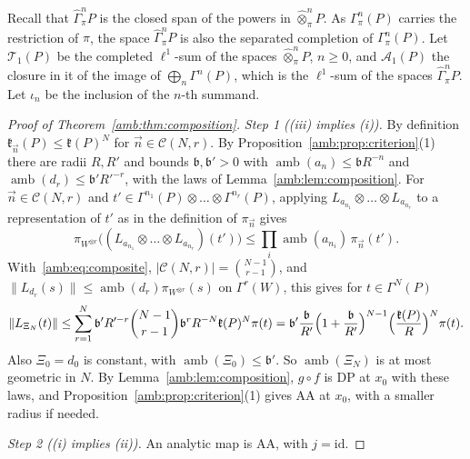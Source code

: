 \documentclass[11pt]{amsart}
\theoremstyle{definition}
\theoremstyle{remark}
\numberwithin{equation}{section}
\newcommand{\id}{\mathrm{id}}
\newcommand{\abs}[1]{\lvert #1\rvert}
\newcommand{\norm}[1]{\lVert #1\rVert}
\theoremstyle{plain}
\theoremstyle{definition}
\theoremstyle{plain}
\newcommand{\hGamma}{\widehat\Gamma}
\begin{document}
Recall that $\hGamma^n_\pi P$ is the closed span of the powers in $\widehat\otimes^n_\pi P$. As $\Gamma^n_\pi(P)$ carries the restriction of $\pi$, the space $\hGamma^n_\pi P$ is also the separated completion of $\Gamma^n_\pi(P)$. Let $\mathcal T_1(P)$ be the completed $\ell^1$-sum of the spaces $\widehat\otimes^n_\pi P$, $n\ge0$, and $\mathcal A_1(P)$ the closure in it of the image of $\bigoplus_n\Gamma^n(P)$, which is the $\ell^1$-sum of the spaces $\hGamma^n_\pi P$. Let $\iota_n$ be the inclusion of the $n$-th summand.

\begin{proof}[Proof of Theorem~\ref{amb:thm:composition}]
\emph{Step 1 ((iii) implies (i)).} By definition $\mathfrak k_{\vec n}(P)\le\mathfrak k(P)^N$ for $\vec n\in\mathcal C(N,r)$. By Proposition~\ref{amb:prop:criterion}(1) there are radii $R,R'$ and bounds $\mathfrak b,\mathfrak b'>0$ with $\operatorname{amb}(a_n)\le \mathfrak bR^{-n}$ and $\operatorname{amb}(d_r)\le \mathfrak b'R'^{-r}$, with the laws of Lemma~\ref{amb:lem:composition}. For $\vec n\in\mathcal C(N,r)$ and $t'\in\Gamma^{n_1}(P)\otimes\dots\otimes\Gamma^{n_r}(P)$, applying $L_{a_{n_1}}\otimes\dots\otimes L_{a_{n_r}}$ to a representation of $t'$ as in the definition of $\pi_{\vec n}$ gives
\begin{equation}\label{amb:b:eq:tensor-bound}
 \pi_{W^{\otimes r}}\bigl((L_{a_{n_1}}\otimes\dots\otimes L_{a_{n_r}})(t')\bigr)\le\prod_i\operatorname{amb}(a_{n_i})\,\pi_{\vec n}(t').
\end{equation}
With~\eqref{amb:eq:composite}, $\abs{\mathcal C(N,r)}=\binom{N-1}{r-1}$, and $\norm{L_{d_r}(s)}\le\operatorname{amb}(d_r)\pi_{W^{\otimes r}}(s)$ on $\Gamma^r(W)$, this gives for $t\in\Gamma^N(P)$
\[
 \norm{L_{\Xi_N}(t)}\le\sum_{r=1}^N\mathfrak b'R'^{-r}\binom{N-1}{r-1}\mathfrak b^rR^{-N}\mathfrak k(P)^N\pi(t)
 =\mathfrak b'\frac{\mathfrak b}{R'}\Bigl(1+\frac{\mathfrak b}{R'}\Bigr)^{N-1}\Bigl(\frac{\mathfrak k(P)}R\Bigr)^N\pi(t).
\]
Also $\Xi_0=d_0$ is constant, with $\operatorname{amb}(\Xi_0)\le \mathfrak b'$. So $\operatorname{amb}(\Xi_N)$ is at most geometric in $N$. By Lemma~\ref{amb:lem:composition}, $g\circ f$ is DP at $x_0$ with these laws, and Proposition~\ref{amb:prop:criterion}(1) gives AA at $x_0$, with a smaller radius if needed.

\emph{Step 2 ((i) implies (ii)).} An analytic map is AA, with $j=\id$.


\end{proof}
\end{document}
